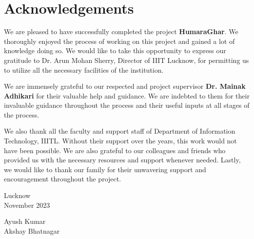 \chapter*{Acknowledgements}


We are pleased to have successfully completed the project \textbf{HumaraGhar}. We thoroughly enjoyed the process of working on
this project and gained a lot of knowledge doing so.
We would like to take this opportunity to express our gratitude to
Dr. Arun Mohan Sherry, Director of IIIT Lucknow, for permitting us to
utilize all the necessary facilities of the institution.

\vspace{0.3cm}

\par We are immensely grateful to our respected and project supervisor
\textbf{Dr. Mainak Adhikari} for their valuable help and guidance. We are
indebted to them for their invaluable guidance throughout the process
and their useful inputs at all stages of the process.

\vspace{0.3cm}

\par We also thank all the faculty and support staff of Department of Information Technology, IIITL. Without their support over the years, this
work would not have been possible. We are also grateful to our colleagues and friends who provided us
with the necessary resources and support whenever needed. Lastly,
we would like to thank our family for their unwavering support and
encouragement throughout the project.

\vspace{3cm}

\begin{minipage}{0.5\textwidth}
    \begin{flushleft}
        Lucknow \\
        November 2023
    \end{flushleft}
\end{minipage}
\begin{minipage}{0.5\textwidth}
    \begin{flushright}
        Ayush Kumar \\
        Akshay Bhatnagar
    \end{flushright}
\end{minipage}
